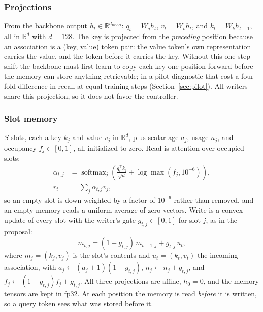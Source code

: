 \documentclass[conference]{IEEEtran}
\DeclareMathOperator*{\softmax}{softmax}
\begin{document}
\subsubsection{Projections}
From the backbone output $h_t \in \mathbb{R}^{d_{\text{model}}}$: $q_t = W_q
h_t$, $v_t = W_v h_t$, and $k_t = W_k h_{t-1}$, all in $\mathbb{R}^{d}$ with $d
= 128$. The key is projected from the \emph{preceding} position because an
association is a (key, value) token pair: the value token's own representation
carries the value, and the token before it carries the key. Without this
one-step shift the backbone must first learn to copy each key one position
forward before the memory can store anything retrievable; in a pilot diagnostic
that cost a four-fold difference in recall at equal training steps
(Section~\ref{sec:pilot}). All writers share this projection, so it does not
favor the controller.

\subsubsection{Slot memory}
$S$ slots, each a key $k_j$ and value $v_j$ in $\mathbb{R}^{d}$, plus scalar
age $a_j$, usage $n_j$, and occupancy $f_j \in [0, 1]$, all initialized to
zero. Read is attention over occupied slots:
\begin{equation}
\begin{split}
\alpha_{t,j} &= \softmax_j\!\left(\frac{q_t^\top k_j}{\sqrt{d}} + \log \max(f_j, 10^{-6})\right),\\
r_t &= \sum_j \alpha_{t,j} v_j ,
\end{split}
\label{eq:read}
\end{equation}
so an empty slot is down-weighted by a factor of $10^{-6}$ rather than removed,
and an empty memory reads a uniform average of zero vectors.
Write is a convex update of every slot with the writer's gate $g_{t,j} \in
[0, 1]$ for slot $j$, as in the proposal:
\begin{equation}
m_{t,j} = (1 - g_{t,j})\, m_{t-1,j} + g_{t,j}\, u_t,
\label{eq:write}
\end{equation}
where $m_j = (k_j, v_j)$ is the slot's contents and $u_t = (k_t, v_t)$ the
incoming association,
with $a_j \leftarrow (a_j + 1)(1 - g_{t,j})$, $n_j \leftarrow n_j + g_{t,j}$,
and $f_j \leftarrow (1 - g_{t,j}) f_j + g_{t,j}$. All three projections are
affine, $h_0 = 0$, and the memory tensors are kept in fp32. At each position the memory is
read \emph{before} it is written, so a query token sees what was stored before
it.
\end{document}
